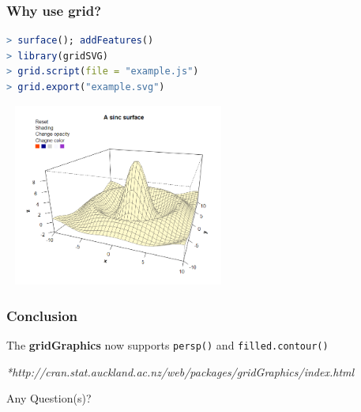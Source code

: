 \documentclass{beamer}
\begin{document}
\begin{frame}[fragile]
\frametitle{Why use \textbf{grid}?}

\begin{lstlisting}[language = R]
> surface(); addFeatures()
> library(gridSVG)
> grid.script(file = "example.js")
> grid.export("example.svg")

\end{lstlisting}

\begin{center}
  \includegraphics[height = 6cm, width = 7.5cm]{plot/origin_1.PNG}
\end{center}

\end{frame}


\begin{frame}[fragile]
\frametitle{Conclusion}
\begin{center}
The \textbf{gridGraphics} now supports \texttt{persp()} and \texttt{filled.contour()}
\end{center}
\hfill \small{\textit{*http://cran.stat.auckland.ac.nz/web/packages/gridGraphics/index.html}}


\end{frame}



\begin{frame}[fragile]

\begin{center}
\Huge Any Question(s)?
\end{center}


\end{frame}
\end{document}
